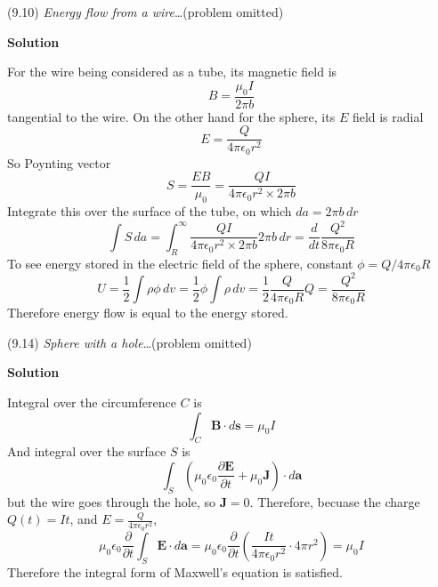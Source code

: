 \documentclass{article}
\begin{document}
\begin{homeworkProblem}
	(9.10) \textit{Energy flow from a wire}\ldots (problem omitted)

	\textbf{Solution}
	
	For the wire being considered as a tube, its magnetic field is
	\[
		B=\frac{\mu_0I}{2\pi b}
	\]
	tangential to the wire. On the other hand for the sphere, its $E$ field is radial
	\[
		E=\frac{Q}{4\pi\epsilon_0r^2}
	\]
	So Poynting vector
	\[
		S=\frac{EB}{\mu_0}=\frac{QI}{4\pi\epsilon_0r^2\times2\pi b}
	\]
	Integrate this over the surface of the tube, on which $da=2\pi b\,dr$
	\[
		\int S\,da=\int_R^\infty\frac{QI}{4\pi\epsilon_0r^2\times2\pi b}2\pi b\,dr=\frac{d}{dt}\frac{Q^2}{8\pi\epsilon_0R}
	\]
	To see energy stored in the electric field of the sphere, constant $\phi=Q/4\pi\epsilon_0R$
	\[
		U=\frac{1}{2}\int\rho\phi{\,}dv=\frac{1}{2}\phi\int\rho{\,}dv=\frac{1}{2}\frac{Q}{4\pi\epsilon_0R}Q=\frac{Q^2}{8\pi\epsilon_0R}
	\]
	Therefore energy flow is equal to the energy stored.
\end{homeworkProblem}


\begin{homeworkProblem}
	(9.14) \textit{Sphere with a hole}\ldots (problem omitted)

	\textbf{Solution}

	Integral over the circumference $C$ is
	\[
		\int_C\mathbf{B}\cdot d\mathbf{s}=\mu_0I
	\]
	And integral over the surface $S$ is
	\[
		\int_S\left(\mu_0\epsilon_0\frac{\partial\mathbf{E}}{\partial t}+\mu_0\mathbf{J}\right)\cdot d\mathbf{a}
	\]
	but the wire goes through the hole, so $\mathbf{J}=0$. Therefore, becuase the charge $Q(t)=It$, and $E=\frac{Q}{4\pi\epsilon_0r^2}$,
	\[
		\mu_0\epsilon_0\frac{\partial}{\partial t}\int_S\mathbf{E}\cdot d\mathbf{a}=\mu_0\epsilon_0\frac{\partial}{\partial t}\left(\frac{It}{4\pi\epsilon_0r^2}\cdot4\pi r^2\right)=\mu_0I
	\]
	Therefore the integral form of Maxwell's equation is satisfied.
\end{homeworkProblem}

\end{document}
